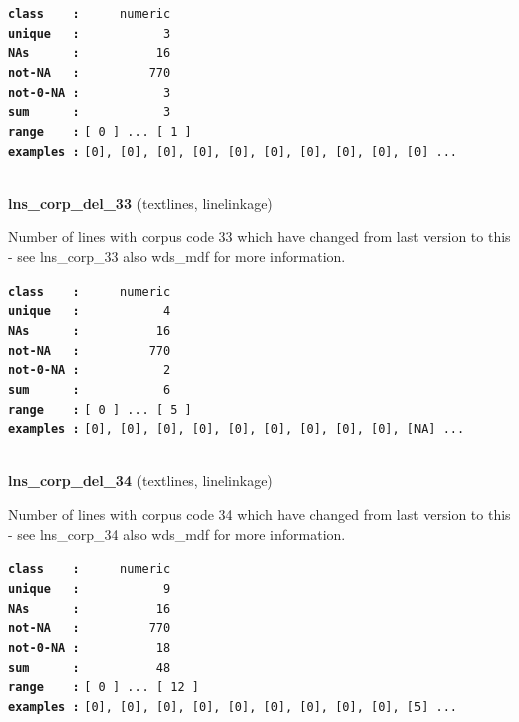 \documentclass[]{article}
\begin{document}
\textbf{\texttt{class\ \ \ \ :}} \texttt{~~~~~numeric}\\
\textbf{\texttt{unique\ \ \ :}} \texttt{~~~~~~~~~~~3}\\
\textbf{\texttt{NAs\ \ \ \ \ \ :}} \texttt{~~~~~~~~~~16}\\
\textbf{\texttt{not-NA\ \ \ :}} \texttt{~~~~~~~~~770}\\
\textbf{\texttt{not-0-NA\ :}} \texttt{~~~~~~~~~~~3}\\
\textbf{\texttt{sum\ \ \ \ \ \ :}} \texttt{~~~~~~~~~~~3}\\
\textbf{\texttt{range\ \ \ \ :}}
\texttt{{[}\ 0\ {]}\ ...\ {[}\ 1\ {]}}\\
\textbf{\texttt{examples\ :}}
\texttt{{[}0{]},\ {[}0{]},\ {[}0{]},\ {[}0{]},\ {[}0{]},\ {[}0{]},\ {[}0{]},\ {[}0{]},\ {[}0{]},\ {[}0{]}\ ...}\\

~

\textbf{lns\_corp\_del\_33} (textlines, linelinkage)

Number of lines with corpus code 33 which have changed from last version
to this - see lns\_corp\_33 also wds\_mdf for more information.

\textbf{\texttt{class\ \ \ \ :}} \texttt{~~~~~numeric}\\
\textbf{\texttt{unique\ \ \ :}} \texttt{~~~~~~~~~~~4}\\
\textbf{\texttt{NAs\ \ \ \ \ \ :}} \texttt{~~~~~~~~~~16}\\
\textbf{\texttt{not-NA\ \ \ :}} \texttt{~~~~~~~~~770}\\
\textbf{\texttt{not-0-NA\ :}} \texttt{~~~~~~~~~~~2}\\
\textbf{\texttt{sum\ \ \ \ \ \ :}} \texttt{~~~~~~~~~~~6}\\
\textbf{\texttt{range\ \ \ \ :}}
\texttt{{[}\ 0\ {]}\ ...\ {[}\ 5\ {]}}\\
\textbf{\texttt{examples\ :}}
\texttt{{[}0{]},\ {[}0{]},\ {[}0{]},\ {[}0{]},\ {[}0{]},\ {[}0{]},\ {[}0{]},\ {[}0{]},\ {[}0{]},\ {[}NA{]}\ ...}\\

~

\textbf{lns\_corp\_del\_34} (textlines, linelinkage)

Number of lines with corpus code 34 which have changed from last version
to this - see lns\_corp\_34 also wds\_mdf for more information.

\textbf{\texttt{class\ \ \ \ :}} \texttt{~~~~~numeric}\\
\textbf{\texttt{unique\ \ \ :}} \texttt{~~~~~~~~~~~9}\\
\textbf{\texttt{NAs\ \ \ \ \ \ :}} \texttt{~~~~~~~~~~16}\\
\textbf{\texttt{not-NA\ \ \ :}} \texttt{~~~~~~~~~770}\\
\textbf{\texttt{not-0-NA\ :}} \texttt{~~~~~~~~~~18}\\
\textbf{\texttt{sum\ \ \ \ \ \ :}} \texttt{~~~~~~~~~~48}\\
\textbf{\texttt{range\ \ \ \ :}}
\texttt{{[}\ 0\ {]}\ ...\ {[}\ 12\ {]}}\\
\textbf{\texttt{examples\ :}}
\texttt{{[}0{]},\ {[}0{]},\ {[}0{]},\ {[}0{]},\ {[}0{]},\ {[}0{]},\ {[}0{]},\ {[}0{]},\ {[}0{]},\ {[}5{]}\ ...}\\
\end{document}
